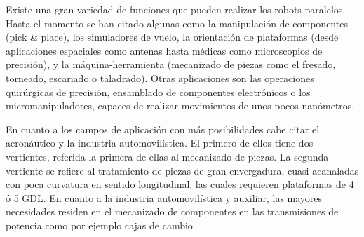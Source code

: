 \documentclass[12pt,a4paper]{article}
\begin{document}
Existe una gran variedad de funciones que pueden realizar los robots paralelos. Hasta el momento se han citado algunas como la manipulación de componentes (pick & place), los simuladores de vuelo, la orientación de plataformas (desde aplicaciones espaciales como antenas hasta médicas como microscopios de precisión), y la máquina-herramienta (mecanizado de piezas como el fresado, torneado, escariado o taladrado). Otras aplicaciones son las operaciones quirúrgicas de precisión, ensamblado de componentes electrónicos o los micromanipuladores, capaces de realizar movimientos de unos pocos nanómetros.

En cuanto a los campos de aplicación con más posibilidades cabe citar el aeronáutico y la industria automovilística. El primero de ellos tiene dos vertientes, referida la primera de ellas al mecanizado de piezas. La segunda vertiente se
refiere al tratamiento de piezas de gran envergadura, cuasi-acanaladas con poca curvatura en sentido longitudinal, las cuales requieren plataformas de 4 ó 5
GDL. En cuanto a la industria automovilística y auxiliar, las mayores necesidades residen en el mecanizado de componentes en las transmisiones de potencia como por ejemplo cajas de cambio
\end{document}
